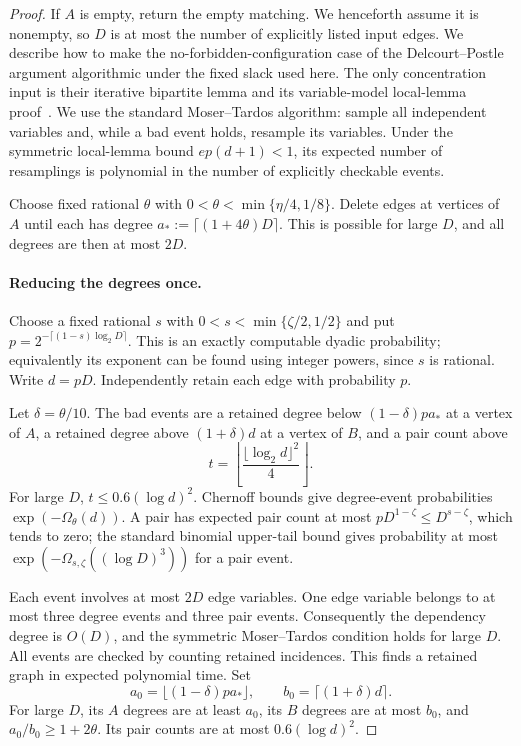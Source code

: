 \documentclass[11pt]{article}
\theoremstyle{definition}\newtheorem{algorithm}{Algorithm}[section]
\numberwithin{equation}{section}
\theoremstyle{remark}\newtheorem*{remark}{Remark}
\begin{document}
\begin{proof}
If $A$ is empty, return the empty matching. We henceforth assume it is
nonempty, so $D$ is at most the number of explicitly listed input edges.
We describe how to make the no-forbidden-configuration case of the
Delcourt--Postle argument algorithmic under the fixed slack used here.
The only concentration input is their iterative bipartite lemma and
its variable-model local-lemma proof~\cite[Lemma~3.3 and Sections~5.5--6]{DP}.
We use the standard Moser--Tardos algorithm: sample all independent
variables and, while a bad event holds, resample its variables. Under
the symmetric local-lemma bound $ep(d+1)<1$, its expected number of
resamplings is polynomial in the number of explicitly checkable events.

Choose fixed rational $\theta$ with
$0<\theta<\min\{\eta/4,1/8\}$. Delete edges at vertices of $A$
until each has degree $a_*:=\lceil(1+4\theta)D\rceil$. This is
possible for large $D$, and all degrees are then at most $2D$.

\paragraph{Reducing the degrees once.}
Choose a fixed rational $s$ with $0<s<\min\{\zeta/2,1/2\}$ and
put $p=2^{-\lceil(1-s)\log_2D\rceil}$. This is an exactly
computable dyadic probability; equivalently its exponent can be found
using integer powers, since $s$ is rational. Write $d=pD$.
Independently retain each edge with probability $p$.

Let $\delta=\theta/10$. The bad events are a retained degree below
$(1-\delta)pa_*$ at a vertex of $A$, a retained degree above
$(1+\delta)d$ at a vertex of $B$, and a pair count above
\[
 t=\left\lfloor\frac{\lfloor\log_2d\rfloor^2}{4}\right\rfloor.
\]
For large $D$, $t\le0.6(\log d)^2$. Chernoff bounds give degree-event
probabilities $\exp(-\Omega_{\theta}(d))$. A pair has expected
pair count at most $pD^{1-\zeta}\le D^{s-\zeta}$, which tends to zero;
the standard binomial upper-tail bound gives probability at most
$\exp(-\Omega_{s,\zeta}((\log D)^3))$ for a pair event.

Each event involves at most $2D$ edge variables. One edge variable
belongs to at most three degree events and three pair events.
Consequently the dependency degree is $O(D)$, and the symmetric
Moser--Tardos condition holds for large $D$. All events are checked
by counting retained incidences. This finds a retained graph in
expected polynomial time. Set
\[
 a_0=\lfloor(1-\delta)pa_*\rfloor,
 \qquad b_0=\lceil(1+\delta)d\rceil.
\]
For large $D$, its $A$ degrees are at least $a_0$, its $B$ degrees
are at most $b_0$, and $a_0/b_0\ge1+2\theta$. Its pair counts
are at most $0.6(\log d)^2$.


\end{proof}
\end{document}
